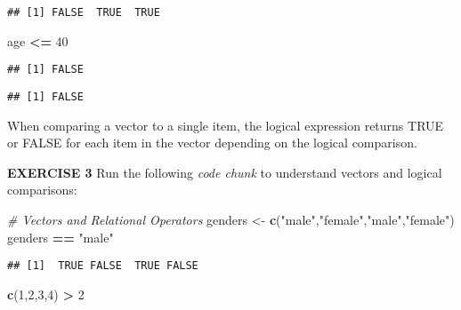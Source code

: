 \documentclass[
]{article}
\newenvironment{Shaded}{\begin{snugshade}}{\end{snugshade}}
\newcommand{\CommentTok}[1]{\textcolor[rgb]{0.56,0.35,0.01}{\textit{#1}}}
\newcommand{\DecValTok}[1]{\textcolor[rgb]{0.00,0.00,0.81}{#1}}
\newcommand{\KeywordTok}[1]{\textcolor[rgb]{0.13,0.29,0.53}{\textbf{#1}}}
\newcommand{\NormalTok}[1]{#1}
\newcommand{\OperatorTok}[1]{\textcolor[rgb]{0.81,0.36,0.00}{\textbf{#1}}}
\newcommand{\StringTok}[1]{\textcolor[rgb]{0.31,0.60,0.02}{#1}}
\begin{document}
\begin{verbatim}
## [1] FALSE  TRUE  TRUE
\end{verbatim}

\begin{Shaded}
\begin{Highlighting}[]
\NormalTok{age }\OperatorTok{<=}\StringTok{ }\DecValTok{40}
\end{Highlighting}
\end{Shaded}

\begin{verbatim}
## [1] FALSE
\end{verbatim}

\begin{Shaded}
\end{Shaded}

\begin{verbatim}
## [1] FALSE
\end{verbatim}

When comparing a vector to a single item, the logical expression returns
TRUE or FALSE for each item in the vector depending on the logical
comparison.

\textbf{EXERCISE 3} Run the following \emph{code chunk} to understand
vectors and logical comparisons:

\begin{Shaded}
\begin{Highlighting}[]
\CommentTok{# Vectors and Relational Operators}
\NormalTok{genders <-}\StringTok{ }\KeywordTok{c}\NormalTok{(}\StringTok{"male"}\NormalTok{,}\StringTok{"female"}\NormalTok{,}\StringTok{"male"}\NormalTok{,}\StringTok{"female"}\NormalTok{)}
\NormalTok{genders }\OperatorTok{==}\StringTok{ "male"}
\end{Highlighting}
\end{Shaded}

\begin{verbatim}
## [1]  TRUE FALSE  TRUE FALSE
\end{verbatim}

\begin{Shaded}
\begin{Highlighting}[]
\KeywordTok{c}\NormalTok{(}\DecValTok{1}\NormalTok{,}\DecValTok{2}\NormalTok{,}\DecValTok{3}\NormalTok{,}\DecValTok{4}\NormalTok{) }\OperatorTok{>}\StringTok{ }\DecValTok{2}
\end{Highlighting}
\end{Shaded}
\end{document}
